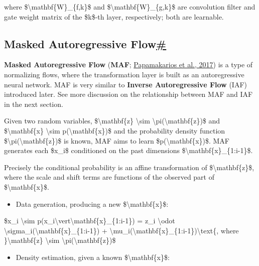 where \$\textbackslash mathbf\{W\}\_\{f,k\}\$ and \$\textbackslash mathbf\{W\}\_\{g,k\}\$ are convolution filter and gate weight matrix of the \$k\$-th layer, respectively; both are learnable.

\subsection{\texorpdfstring{Masked Autoregressive Flow\hyperref[masked-autoregressive-flow]{\#}}{Masked Autoregressive Flow\#}}\label{masked-autoregressive-flow}

\textbf{Masked Autoregressive Flow} (\textbf{MAF}; \href{https://arxiv.org/abs/1705.07057}{Papamakarios et al., 2017}) is a type of normalizing flows, where the transformation layer is built as an autoregressive neural network. MAF is very similar to \textbf{Inverse Autoregressive Flow} (IAF) introduced later. See more discussion on the relationship between MAF and IAF in the next section.

Given two random variables, \$\textbackslash mathbf\{z\} \textbackslash sim \textbackslash pi(\textbackslash mathbf\{z\})\$ and \$\textbackslash mathbf\{x\} \textbackslash sim p(\textbackslash mathbf\{x\})\$ and the probability density function \$\textbackslash pi(\textbackslash mathbf\{z\})\$ is known, MAF aims to learn \$p(\textbackslash mathbf\{x\})\$. MAF generates each \$x\_i\$ conditioned on the past dimensions \$\textbackslash mathbf\{x\}\_\{1:i-1\}\$.

Precisely the conditional probability is an affine transformation of \$\textbackslash mathbf\{z\}\$, where the scale and shift terms are functions of the observed part of \$\textbackslash mathbf\{x\}\$.

\begin{itemize}
\tightlist
\item
  Data generation, producing a new \$\textbackslash mathbf\{x\}\$:
\end{itemize}

\$x\_i \textbackslash sim p(x\_i\textbackslash vert\textbackslash mathbf\{x\}\_\{1:i-1\}) = z\_i \textbackslash odot \textbackslash sigma\_i(\textbackslash mathbf\{x\}\_\{1:i-1\}) + \textbackslash mu\_i(\textbackslash mathbf\{x\}\_\{1:i-1\})\textbackslash text\{, where \}\textbackslash mathbf\{z\} \textbackslash sim \textbackslash pi(\textbackslash mathbf\{z\})\$

\begin{itemize}
\tightlist
\item
  Density estimation, given a known \$\textbackslash mathbf\{x\}\$:
\end{itemize}

